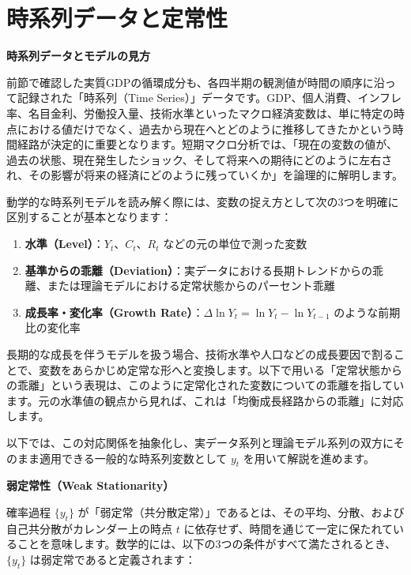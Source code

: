 \documentclass[
  japanese,
  lualatex,
  ja=standard,
  12pt,
  a4paper]{ltjsarticle}
\providecommand{\tightlist}{%
  \setlength{\itemsep}{0pt}\setlength{\parskip}{0pt}}
\begin{document}

\section{時系列データと定常性}\label{ux6642ux7cfbux5217ux30c7ux30fcux30bfux3068ux5b9aux5e38ux6027}

\textbf{時系列データとモデルの見方}

前節で確認した実質GDPの循環成分も、各四半期の観測値が時間の順序に沿って記録された「時系列（Time
Series）」データです。GDP、個人消費、インフレ率、名目金利、労働投入量、技術水準といったマクロ経済変数は、単に特定の時点における値だけでなく、過去から現在へとどのように推移してきたかという時間経路が決定的に重要となります。短期マクロ分析では、「現在の変数の値が、過去の状態、現在発生したショック、そして将来への期待にどのように左右され、その影響が将来の経済にどのように残っていくか」を論理的に解明します。

動学的な時系列モデルを読み解く際には、変数の捉え方として次の3つを明確に区別することが基本となります：

\begin{enumerate}
\def\labelenumi{\arabic{enumi}.}
\tightlist
\item
  \textbf{水準（Level）}：\(Y_t\)、\(C_t\)、\(R_t\)
  などの元の単位で測った変数
\item
  \textbf{基準からの乖離（Deviation）}：実データにおける長期トレンドからの乖離、または理論モデルにおける定常状態からのパーセント乖離
\item
  \textbf{成長率・変化率（Growth
  Rate）}：\(\Delta \ln Y_t = \ln Y_t - \ln Y_{t-1}\)
  のような前期比の変化率
\end{enumerate}

長期的な成長を伴うモデルを扱う場合、技術水準や人口などの成長要因で割ることで、変数をあらかじめ定常な形へと変換します。以下で用いる「定常状態からの乖離」という表現は、このように定常化された変数についての乖離を指しています。元の水準値の観点から見れば、これは「均衡成長経路からの乖離」に対応します。

以下では、この対応関係を抽象化し、実データ系列と理論モデル系列の双方にそのまま適用できる一般的な時系列変数として
\(y_t\) を用いて解説を進めます。

\textbf{弱定常性（Weak Stationarity）}

確率過程 \(\{y_t\}\)
が「弱定常（共分散定常）」であるとは、その平均、分散、および自己共分散がカレンダー上の時点
\(t\)
に依存せず、時間を通じて一定に保たれていることを意味します。数学的には、以下の3つの条件がすべて満たされるとき、\(\{y_t\}\)
は弱定常であると定義されます：
\end{document}
